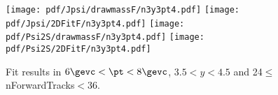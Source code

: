 \begin{figure}[H]
\begin{center}
\texttt{[image: pdf/Jpsi/drawmassF/n3y3pt4.pdf]}
\texttt{[image: pdf/Jpsi/2DFitF/n3y3pt4.pdf]}
\vspace*{-0.5cm}
\texttt{[image: pdf/Psi2S/drawmassF/n3y3pt4.pdf]}
\texttt{[image: pdf/Psi2S/2DFitF/n3y3pt4.pdf]}
\vspace*{-0.5cm}
\end{center}
\caption{Fit results in $6\gevc<\pt<8\gevc$, $3.5<y<4.5$ and 24$\leq$nForwardTracks$<$36.}
\label{Fitn3y3pt4}
\end{figure}
